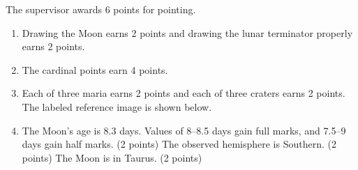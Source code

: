 The supervisor awards 6 points for pointing.
\begin{enumerate}
\item Drawing the Moon earns 2 points and drawing the lunar terminator properly earns 2 points.
\item The cardinal points earn 4 points.
\item Each of three maria earns 2 points and each of three craters earns 2 points. The labeled reference image is shown below.
\item The Moon's age is 8.3 days. Values of 8--8.5 days gain full marks, and 7.5--9 days gain half marks. \hfill(2 points)
The observed hemisphere is Southern. \hfill(2 points)
The Moon is in Taurus. \hfill(2 points)
\end{enumerate}
